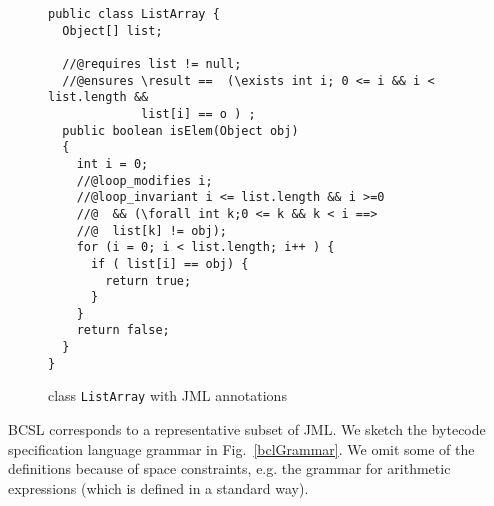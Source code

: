  
\begin{figure}[!h]
\begin{verbatim}
public class ListArray {
  Object[] list;

  //@requires list != null;
  //@ensures \result ==  (\exists int i; 0 <= i && i < list.length &&  
             list[i] == o ) ; 
  public boolean isElem(Object obj)
  {
    int i = 0;
    //@loop_modifies i;
    //@loop_invariant i <= list.length && i >=0 
    //@  && (\forall int k;0 <= k && k < i ==> 
    //@  list[k] != obj); 
    for (i = 0; i < list.length; i++ ) {
      if ( list[i] == obj) {
        return true;	
      }
    }
    return false;
  }
}
\end{verbatim}
\caption{class \texttt{ListArray} with JML annotations} 
\label{replaceSrc}
\end{figure}
BCSL corresponds to a representative subset of JML.
We sketch the bytecode specification language grammar in Fig.~\ref{bclGrammar}. We omit some of the definitions 
because of space constraints, e.g. the grammar for arithmetic expressions (which is defined in a standard way).
